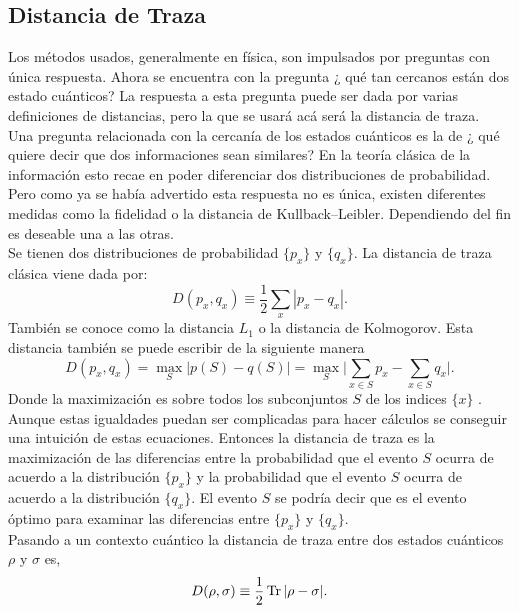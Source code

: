 \subsection{Distancia de Traza}
Los métodos usados, generalmente en física, son impulsados por preguntas con única respuesta. Ahora se encuentra con la pregunta ¿ qué tan cercanos están dos estado cuánticos? La respuesta a esta pregunta puede ser dada por varias definiciones de distancias, pero la que se usará acá será la distancia de traza.
\\
Una pregunta relacionada con la cercanía de los estados cuánticos es la de ¿ qué quiere decir que dos informaciones sean similares? En la teoría clásica de la información esto recae en poder diferenciar dos distribuciones de probabilidad. Pero como ya se había advertido esta respuesta no es única, existen diferentes medidas como la fidelidad o la distancia de Kullback–Leibler. Dependiendo del fin es deseable una a las otras.
\\
Se tienen dos distribuciones de probabilidad $\{ p_{x} \}$ y $\{ q_{x} \}$. La distancia de  traza clásica viene dada por:
\begin{equation}
D(p_{x},q_{x})\equiv \frac{1}{2} \sum_{x}|p_{x}-q_{x}|.
\end{equation}
También se conoce como la distancia $L_{1}$ o la distancia de Kolmogorov. Esta distancia también se puede escribir de la siguiente manera 
\begin{equation}
D(p_{x},q_{x})= \max_{S} \big| p(S)-q(S) \big| = \max_{S} \Bigg| \sum_{x \in S}p_{x}-\sum_{x \in S}q_{x} \Bigg|.
\end{equation}
Donde la maximización es sobre todos los subconjuntos $S$ de los indices $\{ x \}$ \cite{NielsenInformation}. Aunque estas igualdades puedan ser complicadas para hacer cálculos se conseguir una intuición de estas ecuaciones. Entonces la distancia de traza es la maximización  de las diferencias entre la probabilidad que el evento $S$ ocurra de acuerdo a la distribución $\{p_{x} \}$ y la probabilidad que el evento $S$ ocurra de acuerdo a la distribución $\{q_{x} \}$. El evento $S$ se podría decir que es el evento óptimo para examinar las diferencias entre $\{p_{x} \}$ y $\{q_{x} \}$.
\\
Pasando a un contexto cuántico la distancia de traza entre dos estados cuánticos $\rho$ y $\sigma$ es,
\begin{equation}
D(\rho,\sigma) \equiv \frac{1}{2} \Tr |\rho-\sigma|.	
\end{equation}

